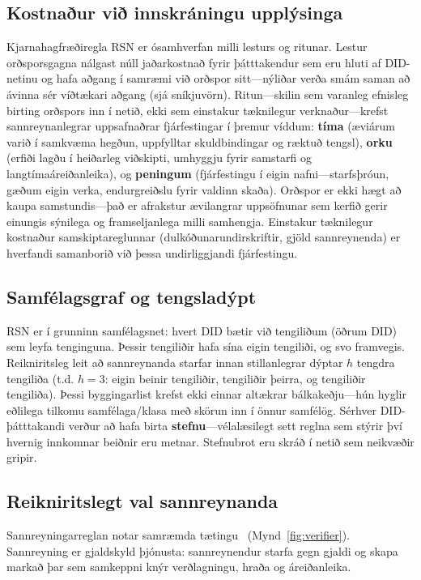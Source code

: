 \documentclass[11pt,a4paper,twocolumn]{article}
\begin{document}
\subsection{Kostnaður við innskráningu upplýsinga}

Kjarnahagfræðiregla RSN er ósamhverfan milli lesturs og ritunar. Lestur orðsporsgagna nálgast núll jaðarkostnað fyrir þátttakendur sem eru hluti af DID-netinu og hafa aðgang í samræmi við orðspor sitt---nýliðar verða smám saman að ávinna sér víðtækari aðgang (sjá sníkjuvörn). Ritun---skilin sem varanleg efnisleg birting orðspors inn í netið, ekki sem einstakur tæknilegur verknaður---krefst sannreynanlegrar uppsafnaðrar fjárfestingar í þremur víddum: \textbf{tíma} (æviárum varið í samkvæma hegðun, uppfylltar skuldbindingar og ræktuð tengsl), \textbf{orku} (erfiði lagðu í heiðarleg viðskipti, umhyggju fyrir samstarfi og langtímaáreiðanleika), og \textbf{peningum} (fjárfestingu í eigin nafni---starfsþróun, gæðum eigin verka, endurgreiðslu fyrir valdinn skaða). Orðspor er ekki hægt að kaupa samstundis---það er afrakstur ævilangrar uppsöfnunar sem kerfið gerir einungis sýnilega og framseljanlega milli samhengja. Einstakur tæknilegur kostnaður samskiptareglunnar (dulkóðunarundirskriftir, gjöld sannreynenda) er hverfandi samanborið við þessa undirliggjandi fjárfestingu.

\subsection{Samfélagsgraf og tengsladýpt}

RSN er í grunninn samfélagsnet: hvert DID bætir við tengiliðum (öðrum DID) sem leyfa tenginguna. Þessir tengiliðir hafa sína eigin tengiliði, og svo framvegis. Reikniritsleg leit að sannreynanda starfar innan stillanlegrar dýptar $h$ tengdra tengiliða (t.d. $h=3$: eigin beinir tengiliðir, tengiliðir þeirra, og tengiliðir tengiliða). Þessi byggingarlist krefst ekki einnar altækrar bálkakeðju---hún hyglir eðlilega tilkomu samfélaga/klasa með skörun inn í önnur samfélög. Sérhver DID-þátttakandi verður að hafa birta \textbf{stefnu}---vélalæsilegt sett reglna sem stýrir því hvernig innkomnar beiðnir eru metnar. Stefnubrot eru skráð í netið sem neikvæðir gripir.

\subsection{Reikniritslegt val sannreynanda}

Sannreyningarreglan notar samræmda tætingu~\cite{karger1997} (Mynd~\ref{fig:verifier}). Sannreyning er gjaldskyld þjónusta: sannreynendur starfa gegn gjaldi og skapa markað þar sem samkeppni knýr verðlagningu, hraða og áreiðanleika.
\end{document}
